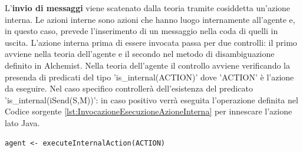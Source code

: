 \documentclass[12pt,a4paper,openright,twoside]{report}
\begin{document}
L'\textbf{invio di messaggi} viene scatenato dalla teoria tramite cosiddetta un'azione interna. Le azioni interne sono azioni che hanno luogo internamente all'agente e, in questo caso, prevede l'inserimento di un messaggio nella coda di quelli in uscita.
L'azione interna prima di essere invocata passa per due controlli: il primo avviene nella teoria dell'agente e il secondo nel metodo di disambiguazione definito in Alchemist.
Nella teoria dell'agente il controllo avviene verificando la presenda di predicati del tipo 'is\_internal(ACTION)' dove 'ACTION' \`e l'azione da eseguire. Nel caso specifico controller\`a dell'esistenza del predicato 'is\_internal(iSend(S,M))': in caso positivo verr\`a eseguita l'operazione definita nel Codice sorgente \ref{lst:InvocazioneEsecuzioneAzioneInterna} per innescare l'azione lato Java.
\medskip
\begin{lstlisting}[label={lst:InvocazioneEsecuzioneAzioneInterna},caption={Invocazione esecuzione azione interna}]
agent <- executeInternalAction(ACTION)
\end{lstlisting}
\end{document}
